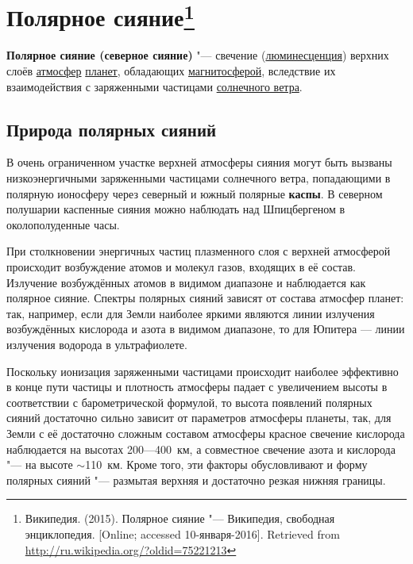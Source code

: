 \documentclass[a4paper,14pt]{article}
\begin{document}
	
	\section*{Полярное сияние\footnote{
			Википедия. (2015). Полярное сияние "--- Википедия, свободная энциклопедия. [Online; accessed 10-января-2016]. Retrieved from \url{http://ru.wikipedia.org/?oldid=75221213}}
		}
	\textbf{Полярное сияние (северное сияние)} "--- свечение (\href{https://ru.wikipedia.org/wiki/\%D0\%9B\%D1\%8E\%D0\%BC\%D0\%B8\%D0\%BD\%D0\%B5\%D1\%81\%D1\%86\%D0\%B5\%D0\%BD\%D1\%86\%D0\%B8\%D1\%8F}{люминесценция}) верхних слоёв \href{https://ru.wikipedia.org/wiki/\%D0\%90\%D1\%82\%D0\%BC\%D0\%BE\%D1\%81\%D1\%84\%D0\%B5\%D1\%80\%D0\%B0}{атмосфер} \href{https://ru.wikipedia.org/wiki/\%D0\%9F\%D0\%BB\%D0\%B0\%D0\%BD\%D0\%B5\%D1\%82\%D0\%B0}{планет}, обладающих \href{https://ru.wikipedia.org/wiki/\%D0\%9C\%D0\%B0\%D0\%B3\%D0\%BD\%D0\%B8\%D1\%82\%D0\%BE\%D1\%81\%D1\%84\%D0\%B5\%D1\%80\%D0\%B0}{магнитосферой}, вследствие их взаимодействия с заряженными частицами \href{https://ru.wikipedia.org/wiki/\%D0\%A1\%D0\%BE\%D0\%BB\%D0\%BD\%D0\%B5\%D1\%87\%D0\%BD\%D1\%8B\%D0\%B9\_\%D0\%B2\%D0\%B5\%D1\%82\%D0\%B5\%D1\%80}{солнечного ветра}.
	
	\tableofcontents
	
	\subsection*{Природа полярных сияний}
	
	В очень ограниченном участке верхней атмосферы сияния могут быть вызваны низкоэнергичными заряженными частицами солнечного ветра, попадающими в полярную ионосферу через северный и южный полярные \textbf{каспы}. В северном полушарии каспенные сияния можно наблюдать над Шпицбергеном в околополуденные часы.
	
	При столкновении энергичных частиц плазменного слоя с верхней атмосферой происходит возбуждение атомов и молекул газов, входящих в её состав. Излучение возбуждённых атомов в видимом диапазоне и наблюдается как полярное сияние. Спектры полярных сияний зависят от состава атмосфер планет: так, например, если для Земли наиболее яркими являются линии излучения возбуждённых кислорода и азота в видимом диапазоне, то для Юпитера --- линии излучения водорода в
	ультрафиолете.
	
	Поскольку ионизация заряженными частицами происходит наиболее эффективно в конце пути частицы и плотность атмосферы падает с увеличением высоты в соответствии с барометрической формулой, то высота появлений полярных сияний достаточно сильно зависит от параметров	атмосферы планеты, так, для Земли с её достаточно сложным составом	атмосферы красное свечение кислорода наблюдается на высотах 200---400~км, а совместное свечение азота и кислорода "--- на высоте $\sim$110~км. Кроме того, эти факторы обусловливают и форму полярных сияний "--- размытая верхняя и достаточно резкая нижняя границы.
	
\end{document}
